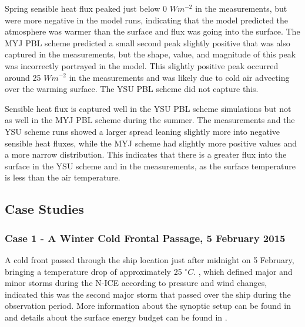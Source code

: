 Spring sensible heat flux peaked just below 0 $Wm^{-2}$ in the measurements, but were more negative in the model runs, indicating that the model predicted the atmosphere was warmer than the surface and flux was going into the surface. The MYJ PBL scheme predicted a small second peak slightly positive that was also captured in the measurements, but the shape, value, and magnitude of this peak was incorrectly portrayed in the model. This slightly positive peak occurred around 25 $Wm^{-2}$   in the measurements and was likely due to cold air advecting over the warming surface. The YSU PBL scheme did not capture this.

Sensible heat flux is captured well in the YSU PBL scheme simulations but not as well in the MYJ PBL scheme during the summer. The measurements and the YSU scheme runs showed a larger spread leaning slightly more into negative sensible heat fluxes, while the MYJ scheme had slightly more positive values and a more narrow distribution. This indicates that there is a greater flux into the surface in the YSU scheme and in the measurements, as the surface temperature is less than the air temperature.

\subsection{Case Studies}
\subsubsection{Case 1 - A Winter Cold Frontal Passage, 5 February 2015}

A cold front passed through the ship location just after midnight on 5 February, bringing a temperature drop of approximately 25 $^{\circ} C$. \citet{cohen:2017}, which defined major and minor storms during the N-ICE according to pressure and wind changes, indicated this was the second major storm that passed over the ship during the observation period. More information about the synoptic setup can be found in \citet{cohen:2017} and details about the surface energy budget can be found in \citet{walden:2017}. 

